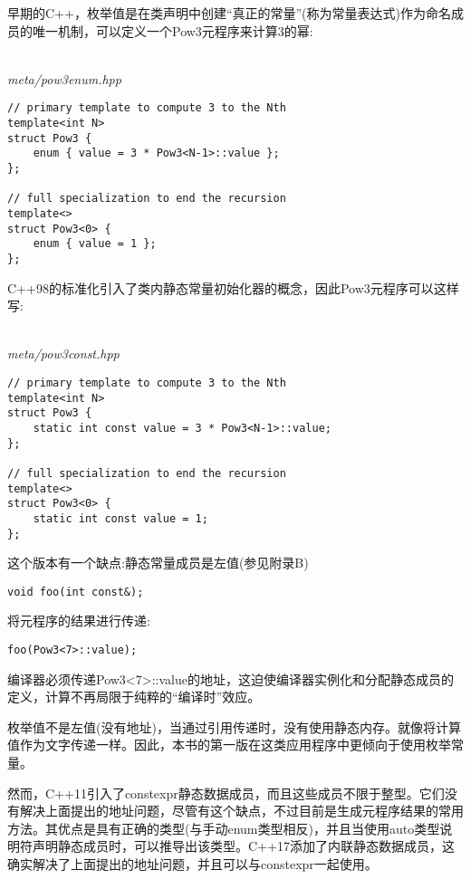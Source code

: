 
早期的C++，枚举值是在类声明中创建“真正的常量”(称为常量表达式)作为命名成员的唯一机制，可以定义一个Pow3元程序来计算3的幂:

\hspace*{\fill} \\ %
\noindent
\textit{meta/pow3enum.hpp}
\begin{lstlisting}[style=styleCXX]
// primary template to compute 3 to the Nth
template<int N>
struct Pow3 {
	enum { value = 3 * Pow3<N-1>::value };
};

// full specialization to end the recursion
template<>
struct Pow3<0> {
	enum { value = 1 };
};
\end{lstlisting}

C++98的标准化引入了类内静态常量初始化器的概念，因此Pow3元程序可以这样写:

\hspace*{\fill} \\ %
\noindent
\textit{meta/pow3const.hpp}
\begin{lstlisting}[style=styleCXX]
// primary template to compute 3 to the Nth
template<int N>
struct Pow3 {
	static int const value = 3 * Pow3<N-1>::value;
};

// full specialization to end the recursion
template<>
struct Pow3<0> {
	static int const value = 1;
};
\end{lstlisting}

这个版本有一个缺点:静态常量成员是左值(参见附录B)

\begin{lstlisting}[style=styleCXX]
void foo(int const&);
\end{lstlisting}

将元程序的结果进行传递:

\begin{lstlisting}[style=styleCXX]
foo(Pow3<7>::value);
\end{lstlisting}

编译器必须传递Pow3<7>::value的地址，这迫使编译器实例化和分配静态成员的定义，计算不再局限于纯粹的“编译时”效应。

枚举值不是左值(没有地址)，当通过引用传递时，没有使用静态内存。就像将计算值作为文字传递一样。因此，本书的第一版在这类应用程序中更倾向于使用枚举常量。

然而，C++11引入了constexpr静态数据成员，而且这些成员不限于整型。它们没有解决上面提出的地址问题，尽管有这个缺点，不过目前是生成元程序结果的常用方法。其优点是具有正确的类型(与手动enum类型相反)，并且当使用auto类型说明符声明静态成员时，可以推导出该类型。C++17添加了内联静态数据成员，这确实解决了上面提出的地址问题，并且可以与constexpr一起使用。























